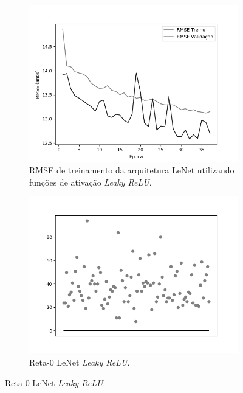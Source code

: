 \begin{figure}[hb!]
\begin{subfigure}[hb]{0.5\linewidth}
		\end{subfigure}\\
		\begin{subfigure}[hb]{0.5\linewidth}
			\caption{RMSE de treinamento da arquitetura LeNet utilizando funções de ativação \emph{Leaky ReLU}.}
			\label{fig:redeneuralbiologica}
			\includegraphics[width=\linewidth]{img/graficos/history/lenet/fig-history-image-treat-3-lenet-lrelu-rmse.png}
		\end{subfigure}
		\begin{subfigure}[hb]{0.5\linewidth}
			\caption{Reta-0 LeNet \emph{Leaky ReLU}.}
			\label{fig:redeneuralbiologica}
		 \includegraphics[width=\linewidth]{img/graficos/reta0/lenet/fig-reta-0-image-treat-3-lenet-lrelu.png}
		\end{subfigure}%
	\end{figure}


